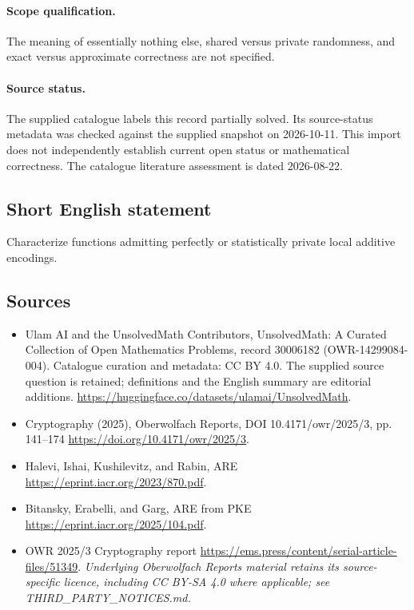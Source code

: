 \documentclass[11pt]{article}
\begin{document}
\paragraph{Scope qualification.}
The meaning of essentially nothing else, shared versus private randomness, and exact versus approximate correctness are not specified.
\paragraph{Source status.}
The supplied catalogue labels this record partially solved. Its source-status metadata was checked against the supplied snapshot on 2026-10-11. This import does not independently establish current open status or mathematical correctness. The catalogue literature assessment is dated 2026-08-22.
\subsection{Short English statement}
Characterize functions admitting perfectly or statistically private local additive encodings.
\subsection{Sources}
\begin{itemize}
\item[\hypertarget{source:30006182:1}{S1}] Ulam AI and the UnsolvedMath Contributors, UnsolvedMath: A Curated Collection of Open Mathematics Problems, record 30006182 (OWR-14299084-004). Catalogue curation and metadata: CC BY 4.0. The supplied source question is retained; definitions and the English summary are editorial additions.
\url{https://huggingface.co/datasets/ulamai/UnsolvedMath}.
\item[\hypertarget{source:30006182:2}{S2}] Cryptography (2025), Oberwolfach Reports, DOI 10.4171/owr/2025/3, pp. 141--174
\url{https://doi.org/10.4171/owr/2025/3}.
\item[\hypertarget{source:30006182:3}{S3}] Halevi, Ishai, Kushilevitz, and Rabin, ARE
\url{https://eprint.iacr.org/2023/870.pdf}.
\item[\hypertarget{source:30006182:4}{S4}] Bitansky, Erabelli, and Garg, ARE from PKE
\url{https://eprint.iacr.org/2025/104.pdf}.
\item[\hypertarget{source:30006182:5}{S5}] OWR 2025/3 Cryptography report
\url{https://ems.press/content/serial-article-files/51349}.
\textit{Underlying Oberwolfach Reports material retains its source-specific licence, including CC BY-SA 4.0 where applicable; see THIRD\_PARTY\_NOTICES.md.}
\end{itemize}
\end{document}
